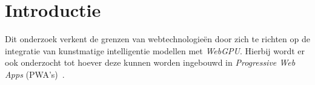 
\section{Introductie}%
\label{sec:introductie}







Dit onderzoek verkent de grenzen van webtechnologieën door zich te richten op de integratie van kunstmatige intelligentie modellen met \textit{WebGPU}. Hierbij wordt er ook onderzocht tot hoever deze kunnen worden ingebouwd in \textit{Progressive Web Apps} (PWA's)~\autocite{Shumylo2023}. 

